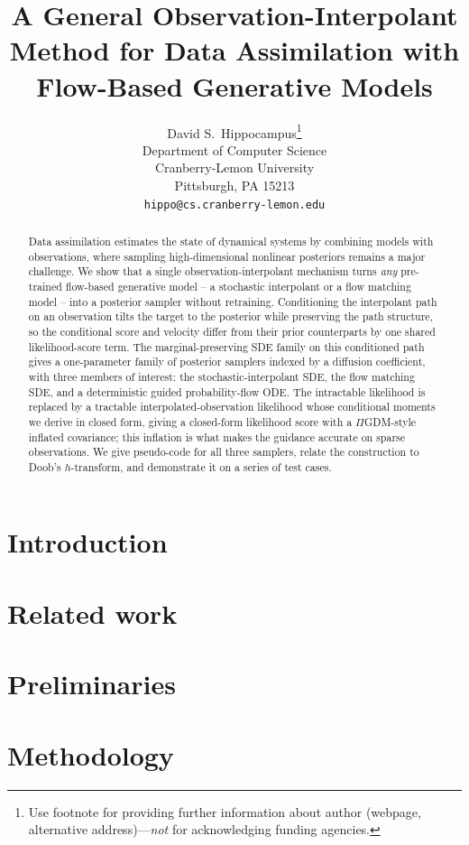 \documentclass{article} %
\title{A General Observation-Interpolant Method for Data Assimilation with Flow-Based Generative Models}
\author{%
  David S.~Hippocampus\thanks{Use footnote for providing further information
    about author (webpage, alternative address)---\emph{not} for acknowledging
    funding agencies.} \\
  Department of Computer Science\\
  Cranberry-Lemon University\\
  Pittsburgh, PA 15213 \\
  \texttt{hippo@cs.cranberry-lemon.edu} \\
}
\theoremstyle{plain}
\theoremstyle{definition}
\theoremstyle{remark}
\begin{document}
\maketitle


\begin{abstract}
Data assimilation estimates the state of dynamical systems by combining models with observations, where sampling high-dimensional nonlinear posteriors remains a major challenge. We show that a single observation-interpolant mechanism turns \emph{any} pre-trained flow-based generative model -- a stochastic interpolant or a flow matching model -- into a posterior sampler without retraining. Conditioning the interpolant path on an observation tilts the target to the posterior while preserving the path structure, so the conditional score and velocity differ from their prior counterparts by one shared likelihood-score term. The marginal-preserving SDE family on this conditioned path gives a one-parameter family of posterior samplers indexed by a diffusion coefficient, with three members of interest: the stochastic-interpolant SDE, the flow matching SDE, and a deterministic guided probability-flow ODE. The intractable likelihood is replaced by a tractable interpolated-observation likelihood whose conditional moments we derive in closed form, giving a closed-form likelihood score with a $\Pi$GDM-style inflated covariance; this inflation is what makes the guidance accurate on sparse observations. We give pseudo-code for all three samplers, relate the construction to Doob's $h$-transform, and demonstrate it on a series of test cases.
\end{abstract}


\section{Introduction}\label{sec:introduction}


\section{Related work}\label{sec:related_work}


\section{Preliminaries}\label{sec:preliminaries}


\section{Methodology}\label{sec:methodology}

\end{document}
